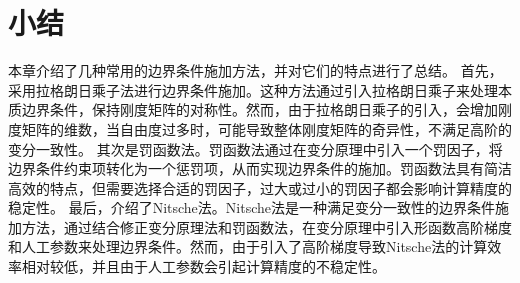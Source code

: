 \section{小结}
本章介绍了几种常用的边界条件施加方法，并对它们的特点进行了总结。
首先，采用拉格朗日乘子法进行边界条件施加。这种方法通过引入拉格朗日乘子来处理本质边界条件，保持刚度矩阵的对称性。然而，由于拉格朗日乘子的引入，会增加刚度矩阵的维数，当自由度过多时，可能导致整体刚度矩阵的奇异性，不满足高阶的变分一致性。
其次是罚函数法。罚函数法通过在变分原理中引入一个罚因子，将边界条件约束项转化为一个惩罚项，从而实现边界条件的施加。罚函数法具有简洁高效的特点，但需要选择合适的罚因子，过大或过小的罚因子都会影响计算精度的稳定性。
最后，介绍了Nitsche法。Nitsche法是一种满足变分一致性的边界条件施加方法，通过结合修正变分原理法和罚函数法，在变分原理中引入形函数高阶梯度和人工参数来处理边界条件。然而，由于引入了高阶梯度导致Nitsche法的计算效率相对较低，并且由于人工参数会引起计算精度的不稳定性。





